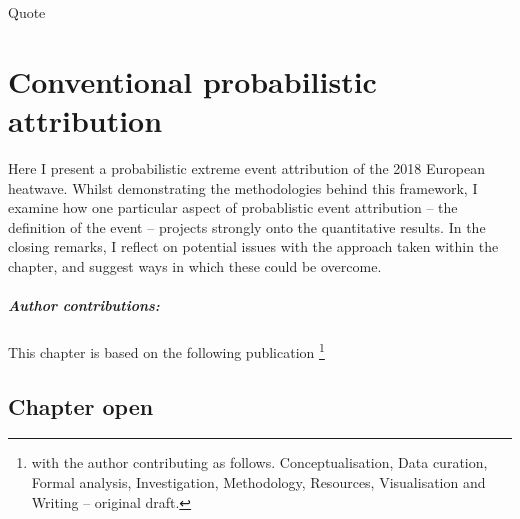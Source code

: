 \begin{savequote}[8cm]
    Quote
\end{savequote}
    
\chapter{\label{ch1}Conventional probabilistic attribution} 

Here I present a probabilistic extreme event attribution of the 2018 European heatwave. Whilst demonstrating the methodologies behind this framework, I examine how one particular aspect of probablistic event attribution -- the definition of the event -- projects strongly onto the quantitative results. In the closing remarks, I reflect on potential issues with the approach taken within the chapter, and suggest ways in which these could be overcome.
\small\paragraph{Author contributions:} This chapter is based on the following publication \footnote{with the author contributing as follows. Conceptualisation, Data curation, Formal analysis, Investigation, Methodology, Resources, Visualisation and Writing -- original draft.} \par\vspace{1em}

\clearpage

\minitoc

\clearpage

\section{Chapter open}

